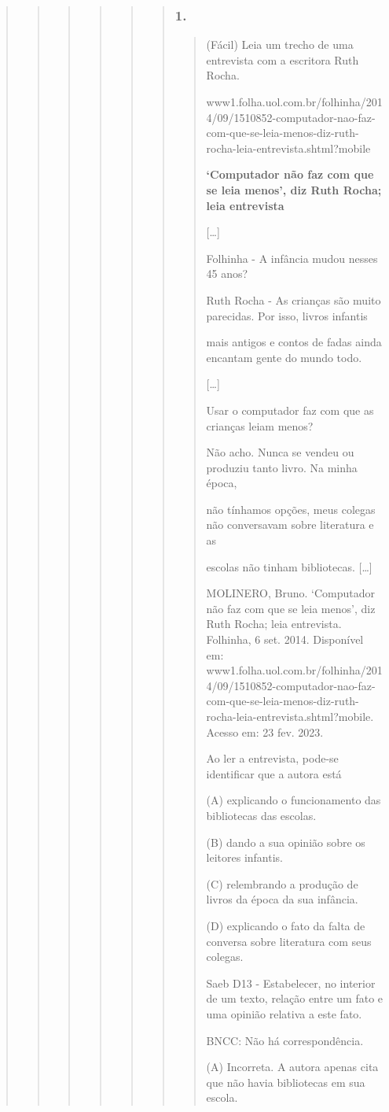 \begin{quote}
\begin{quote}
\begin{quote}
\begin{quote}
\begin{quote}
\begin{quote}
\subsubsection{1. }\label{section-63}

\begin{quote}
(Fácil) Leia um trecho de uma entrevista com a escritora Ruth Rocha.

www1.folha.uol.com.br/folhinha/2014/09/1510852-computador-nao-faz-com-que-se-leia-menos-diz-ruth-rocha-leia-entrevista.shtml?mobile

\textbf{`Computador não faz com que se leia menos', diz Ruth Rocha; leia
entrevista}

{[}\ldots{}{]}

Folhinha - A infância mudou nesses 45 anos?

Ruth Rocha - As crianças são muito parecidas. Por isso, livros infantis

mais antigos e contos de fadas ainda encantam gente do mundo todo.

{[}\ldots{}{]}

Usar o computador faz com que as crianças leiam menos?

Não acho. Nunca se vendeu ou produziu tanto livro. Na minha época,

não tínhamos opções, meus colegas não conversavam sobre literatura e as

escolas não tinham bibliotecas. {[}\ldots{}{]}

MOLINERO, Bruno. `Computador não faz com que se leia menos', diz Ruth
Rocha; leia entrevista. Folhinha, 6 set. 2014. Disponível em:
www1.folha.uol.com.br/folhinha/2014/09/1510852-computador-nao-faz-com-que-se-leia-menos-diz-ruth-rocha-leia-entrevista.shtml?mobile.
Acesso em: 23 fev. 2023.

Ao ler a entrevista, pode-se identificar que a autora está

(A) explicando o funcionamento das bibliotecas das escolas.

(B) dando a sua opinião sobre os leitores infantis.

(C) relembrando a produção de livros da época da sua infância.

(D) explicando o fato da falta de conversa sobre literatura com seus
colegas.

Saeb D13 - Estabelecer, no interior de um texto, relação entre um fato e
uma opinião relativa a este fato.

BNCC: Não há correspondência.

(A) Incorreta. A autora apenas cita que não havia bibliotecas em sua
escola.


\end{quote}
\end{quote}
\end{quote}
\end{quote}
\end{quote}
\end{quote}
\end{quote}
